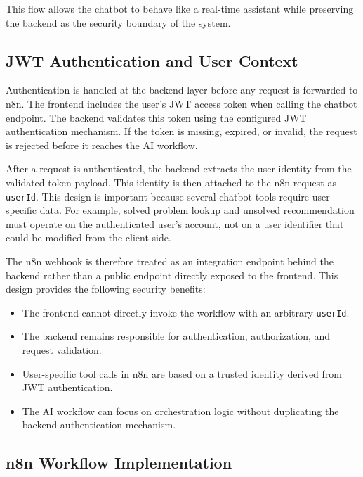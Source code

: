 This flow allows the chatbot to behave like a real-time assistant while preserving the backend as the security boundary of the system.

\subsection{JWT Authentication and User Context}

Authentication is handled at the backend layer before any request is forwarded to n8n. The frontend includes the user's JWT access token when calling the chatbot endpoint. The backend validates this token using the configured JWT authentication mechanism. If the token is missing, expired, or invalid, the request is rejected before it reaches the AI workflow.

After a request is authenticated, the backend extracts the user identity from the validated token payload. This identity is then attached to the n8n request as \texttt{userId}. This design is important because several chatbot tools require user-specific data. For example, solved problem lookup and unsolved recommendation must operate on the authenticated user's account, not on a user identifier that could be modified from the client side.

The n8n webhook is therefore treated as an integration endpoint behind the backend rather than a public endpoint directly exposed to the frontend. This design provides the following security benefits:
\begin{itemize}
    \item The frontend cannot directly invoke the workflow with an arbitrary \texttt{userId}.
    
    \item The backend remains responsible for authentication, authorization, and request validation.
    
    \item User-specific tool calls in n8n are based on a trusted identity derived from JWT authentication.
    
    \item The AI workflow can focus on orchestration logic without duplicating the backend authentication mechanism.
\end{itemize}

\subsection{n8n Workflow Implementation}

